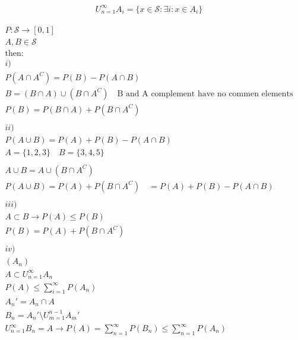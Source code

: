 \documentclass[10pt]{article}
\begin{document}
\newpage

\begin{align*}
    U_{n=1}^\infty A_i = \{x \in \mathcal{S} : \exists i: x \in A_i\}
\end{align*}

\begin{align*}
    P: \mathcal{S} \to [0, 1]\\
    A, B \in \mathcal{S}\\
    \text{then:}\\
    i)\\
     P(A \cap A^C) = P(B) - P(A \cap B)\\
    B = (B \cap A) \cup (B \cap A^C) \quad\text{B and A complement have no commen elements}\\
    P(B) = P(B\cap A) + P(B \cap A^C)\\
    \\
    ii)\\
     P(A \cup B) = P(A) + P(B) - P(A \cap B)\\
    A = \{1, 2, 3\} \quad B = \{3, 4, 5\}\\
    \\
    A \cup B = A \cup (B \cap A^C)\\
    P(A \cup B) = P(A) + P(B \cap A^C) \quad = P(A) + P(B) - P(A \cap B)\\
    \\
    iii)\\
    A \subset B \to P(A) \leq P(B)\\
    P(B) = P(A) + P(B \cap A^C)\\
    \\
    iv)\\
    (A_n)\\
    A \subset U_{n=1}^\infty A_n\\
    P(A) \leq \sum_{i = 1}^{\infty}P(A_n)\\
    A_n' = A_n \cap A\\
    B_n = A_n' \setminus U_{m=1}^{n-1} A_m'\\
    U_{n=1}^\infty B_n = A \to P(A) = \sum_{n = 1}^{\infty}P(B_n) \leq \sum_{n = 1}^{\infty} P(A_n)
\end{align*}

\newpage
\end{document}
